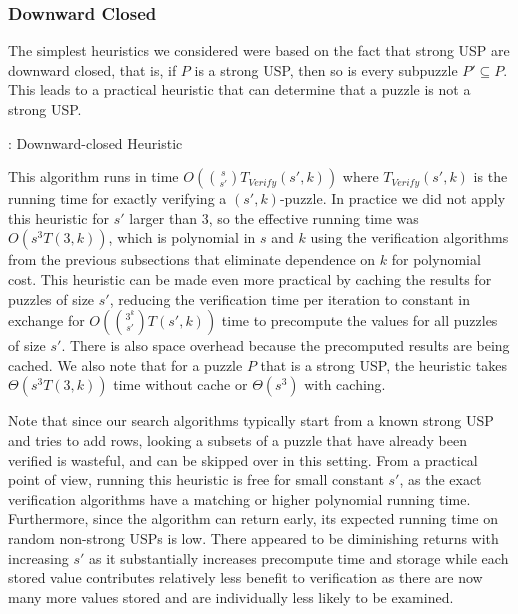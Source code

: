 \documentclass[11pt]{article}
\newcommand\sse{\subseteq}
\begin{document}
\subsubsection{Downward Closed}

The simplest heuristics we considered were based on the fact that
strong USP are downward closed, that is, if $P$ is a strong USP, then
so is every subpuzzle $P' \sse P$.  This leads to a practical heuristic
that can determine that a puzzle is not a strong USP.

\begin{algorithm}
  \caption{: Downward-closed Heuristic}
  \label{alg:downward-closed}
\begin{algorithmic}[1]
  \For{$P' \sse P, |P'| = s'$}
        \EndIf
  \EndFor{}
  \EndFunction
\end{algorithmic}
\end{algorithm}

This algorithm runs in time $O(\binom{s}{s'} T_{Verify}(s', k))$ where
$T_{Verify}(s',k)$ is the running time for exactly verifying a
$(s',k)$-puzzle.  In practice we did not apply this heuristic for $s'$
larger than $3$, so the effective running time was $O(s^3 T(3,k))$,
which is polynomial in $s$ and $k$ using the verification algorithms
from the previous subsections that eliminate dependence on $k$ for
polynomial cost.  This heuristic can be made even more practical by
caching the results for puzzles of size $s'$, reducing the
verification time per iteration to constant in exchange for
$O(\binom{3^k}{s'}T(s',k))$ time to precompute the values for all puzzles of
size $s'$.  There is also space overhead because the precomputed
results are being cached.  We also note that for a puzzle $P$ that is
a strong USP, the heuristic takes $\Theta(s^3 T(3,k))$ time without
cache or $\Theta(s^3)$ with caching.

Note that since our search algorithms typically start from a known
strong USP and tries to add rows, looking a subsets of a puzzle that
have already been verified is wasteful, and can be skipped over in
this setting.  From a practical point of view, running this heuristic
is free for small constant $s'$, as the exact verification algorithms
have a matching or higher polynomial running time.  Furthermore, since
the algorithm can return early, its expected running time on random
non-strong USPs is low.  There appeared to be diminishing returns with
increasing $s'$ as it substantially increases precompute time and
storage while each stored value contributes relatively less benefit to
verification as there are now many more values stored and are individually less likely to be examined.
\end{document}
